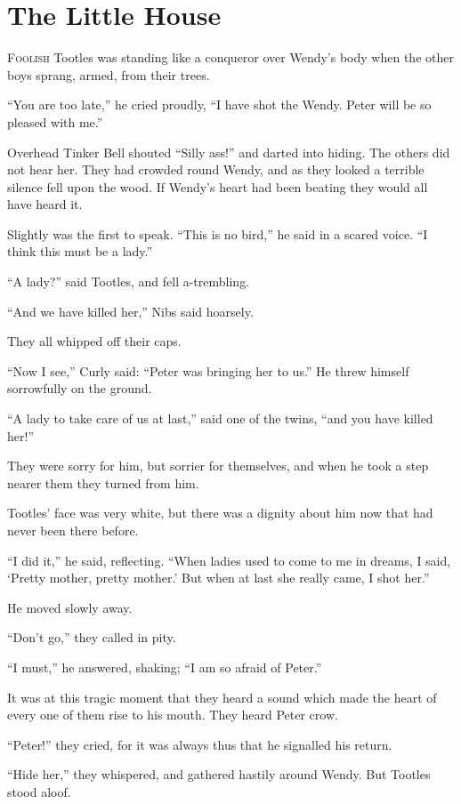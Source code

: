\chapter{The Little House}

\lettrine{F}{oolish} Tootles was standing like a conqueror over Wendy's body when the other
boys sprang, armed, from their trees.

``You are too late,'' he cried proudly, ``I have shot the Wendy.
Peter will be so pleased with me.''

Overhead Tinker Bell shouted ``Silly ass!'' and darted into hiding.
The others did not hear her.
They had crowded round Wendy, and as they looked a terrible silence fell upon
the wood.
If Wendy's heart had been beating they would all have heard it.

Slightly was the first to speak.
``This is no bird,'' he said in a scared voice.
``I think this must be a lady.''

``A lady?'' said Tootles, and fell a-trembling.

``And we have killed her,'' Nibs said hoarsely.

They all whipped off their caps.

``Now I see,'' Curly said: ``Peter was bringing her to us.''
He threw himself sorrowfully on the ground.

``A lady to take care of us at last,'' said one of the twins, ``and you
have killed her!''

They were sorry for him, but sorrier for themselves, and when he took a step
nearer them they turned from him.

Tootles' face was very white, but there was a dignity about him now that had
never been there before.

``I did it,'' he said, reflecting.
``When ladies used to come to me in dreams, I said, ‘Pretty mother, pretty
mother.'
But when at last she really came, I shot her.''

He moved slowly away.

``Don't go,'' they called in pity.

``I must,'' he answered, shaking; ``I am so afraid of Peter.''

It was at this tragic moment that they heard a sound which made the
heart of every one of them rise to his mouth. They heard Peter crow.

``Peter!'' they cried, for it was always thus that he signalled his return.

``Hide her,'' they whispered, and gathered hastily around Wendy.
But Tootles stood aloof.

